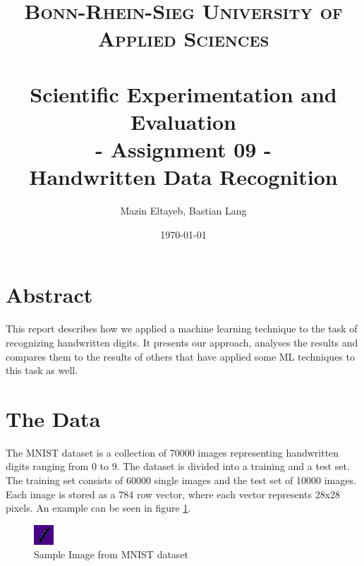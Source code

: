 \documentclass[paper=a4, fontsize=11pt]{scrartcl} %
\title{	
\normalfont \normalsize 
\textsc{Bonn-Rhein-Sieg University of Applied Sciences} \\ [25pt] %
\horrule{0.5pt} \\[0.4cm] %
\huge Scientific Experimentation and Evaluation\\
- Assignment 09 - \\ 
Handwritten Data Recognition
\horrule{2pt} \\[0.5cm] %
}
\author{Mazin Eltayeb, Bastian Lang} %
\date{\normalsize\today} %
\numberwithin{equation}{section} %
\numberwithin{figure}{section} %
\numberwithin{table}{section} %
\begin{document}
\maketitle %

\tableofcontents
\newpage

\section{Abstract}
This report describes how we applied a machine learning technique to the task of recognizing handwritten digits. It presents our approach, analyses the results and compares them to the results of others that have applied some ML techniques to this task as well.

\section{The Data}
The MNIST dataset is a collection of 70000 images representing handwritten digits ranging from 0 to 9.
The dataset is divided into a training and a test set.
The training set consists of 60000 single images and the test set of 10000 images.
Each image is stored as a 784 row vector, where each vector represents 28x28 pixels.
An example can be seen in figure \ref{fig:sample}.

\begin{figure}[H]
	\centering
	\includegraphics[width = 0.6\linewidth]{./sample.jpg}
	\caption{Sample Image from MNIST dataset}
	\label{fig:sample}
\end{figure}
\end{document}
